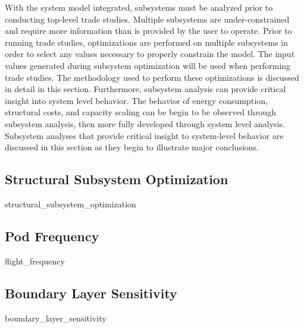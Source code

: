 With the system model integrated, subsystems must be analyzed prior to conducting top-level trade studies.
Multiple subsystems are under-constrained and require more information than is provided by the user to operate.
Prior to running trade studies, optimizations are performed on multiple subsystems
in order to select any values necessary to properly constrain the model.
The input values generated during subsystem optimization will be used when performing trade studies.
The methodology used to perform these optimizations is discussed in detail in this section.
Furthermore, subsystem analysis can provide critical insight into system level behavior.
The behavior of energy consumption, structural costs, and capacity scaling
can be begin to be observed through subsystem analysis,
then more fully developed through system level analysis.
Subsystem analyses that provide critical insight to system-level behavior are
discussed in this section as they begin to illustrate major conclusions.
\subsection{Structural Subsystem Optimization}
	{structural_subsystem_optimization}
\subsection{Pod Frequency}
	{flight_frequency}
\subsection{Boundary Layer Sensitivity}
	{boundary_layer_sensitivity}
